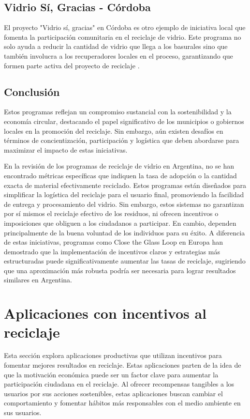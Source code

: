 \documentclass[main.tex]{subfiles}
\begin{document}
\subsection{Vidrio Sí, Gracias - Córdoba}
El proyecto "Vidrio sí, gracias" en Córdoba es otro ejemplo de iniciativa local que fomenta la participación comunitaria en el reciclaje de vidrio. Este programa no solo ayuda a reducir la cantidad de vidrio que llega a los basurales sino que también involucra a los recuperadores locales en el proceso, garantizando que formen parte activa del proyecto de reciclaje \cite{cordoba2024vidrio}.

\subsection{Conclusión}

Estos programas reflejan un compromiso sustancial con la sostenibilidad y la economía circular, destacando el papel significativo de los municipios o gobiernos locales en la promoción del reciclaje. Sin embargo, aún existen desafíos en términos de concientización, participación y logística que deben abordarse para maximizar el impacto de estas iniciativas. 

En la revisión de los programas de reciclaje de vidrio en Argentina, no se han encontrado métricas específicas que indiquen la tasa de adopción o la cantidad exacta de material efectivamente reciclado. Estos programas están diseñados para simplificar la logística del reciclaje para el usuario final, promoviendo la facilidad de entrega y procesamiento del vidrio. Sin embargo, estos sistemas no garantizan por sí mismos el reciclaje efectivo de los residuos, ni ofrecen incentivos o imposiciones que obliguen a los ciudadanos a participar. En cambio, dependen principalmente de la buena voluntad de los individuos para su éxito. A diferencia de estas iniciativas, programas como Close the Glass Loop en Europa \cite{closetheglassloop2020ue} han demostrado que la implementación de incentivos claros y estrategias más estructuradas puede significativamente aumentar las tasas de reciclaje, sugiriendo que una aproximación más robusta podría ser necesaria para lograr resultados similares en Argentina.

\section{Aplicaciones con incentivos al reciclaje}
Esta sección explora aplicaciones productivas que utilizan incentivos para fomentar mejores resultados en reciclaje. Estas aplicaciones parten de la idea de que la motivación económica puede ser un factor clave para aumentar la participación ciudadana en el reciclaje. Al ofrecer recompensas tangibles a los usuarios por sus acciones sostenibles, estas aplicaciones buscan cambiar el comportamiento y fomentar hábitos más responsables con el medio ambiente en sus usuarios.
\end{document}
